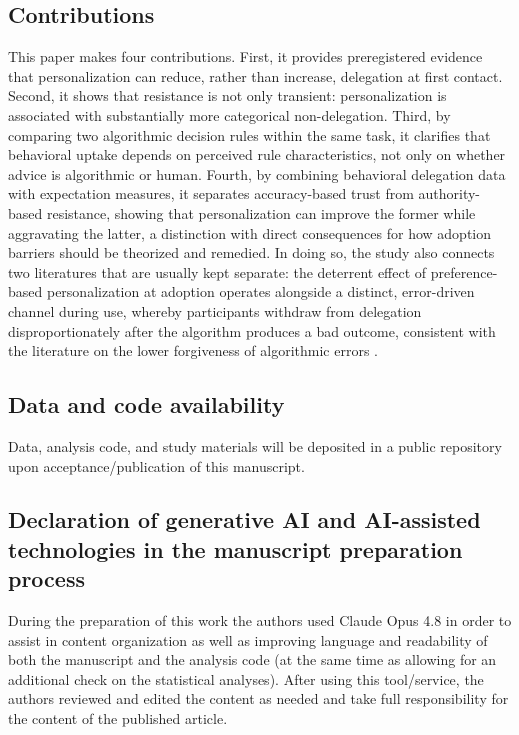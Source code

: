 \documentclass[a4paper, 12pt, fleqn]{article}
\theoremstyle{definition}
\begin{document}
\subsection{Contributions}
This paper makes four contributions. First, it provides preregistered evidence that personalization can reduce, rather than increase, delegation at first contact. Second, it shows that resistance is not only transient: personalization is associated with substantially more categorical non-delegation. Third, by comparing two algorithmic decision rules within the same task, it clarifies that behavioral uptake depends on perceived rule characteristics, not only on whether advice is algorithmic or human. Fourth, by combining behavioral delegation data with expectation measures, it separates accuracy-based trust from authority-based resistance, showing that personalization can improve the former while aggravating the latter, a distinction with direct consequences for how adoption barriers should be theorized and remedied. In doing so, the study also connects two literatures that are usually kept separate: the deterrent effect of preference-based personalization at adoption operates alongside a distinct, error-driven channel during use, whereby participants withdraw from delegation disproportionately after the algorithm produces a bad outcome, consistent with the literature on the lower forgiveness of algorithmic errors \citep{Dietvorst2018,Renier2021}.

\subsection{Data and code availability}
Data, analysis code, and study materials will be deposited in a public repository upon acceptance/publication of this manuscript. 


\subsection{Declaration of generative AI and AI-assisted technologies in the manuscript preparation process}
During the preparation of this work the authors used Claude Opus 4.8 in order to assist in content organization as well as improving language and readability of both the manuscript and the analysis code (at the same time as allowing for an additional check on the statistical analyses). After using this tool/service, the authors reviewed and edited the content as needed and take full responsibility for the content of the published article.


\newpage
\thispagestyle{plain}
\addtolength{\topmargin}{-.5cm}
\addtolength{\textheight}{.8cm}



\end{document}
